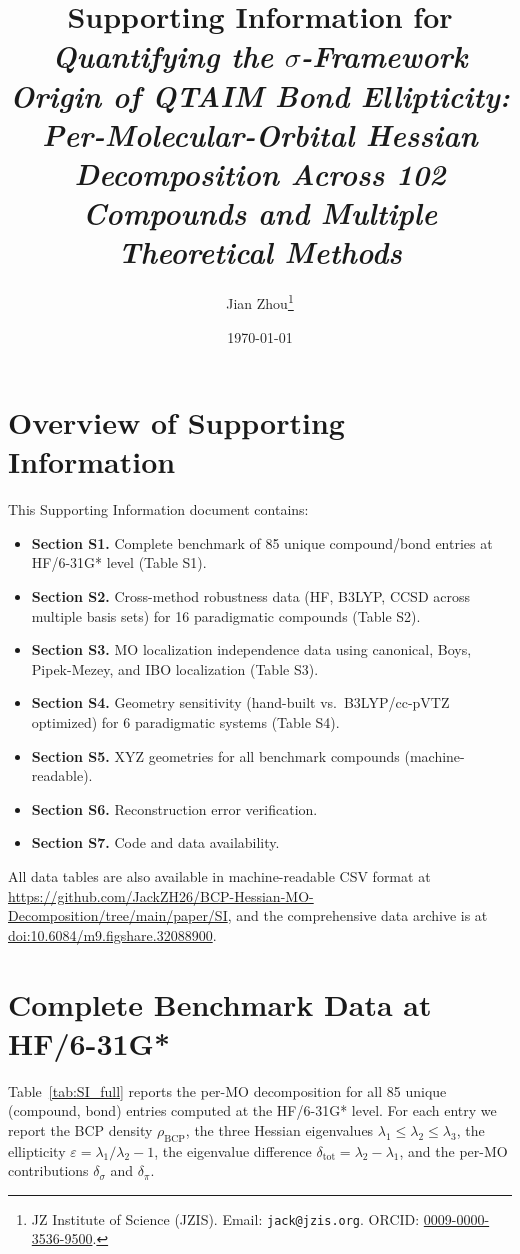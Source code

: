\documentclass[11pt,a4paper]{article}
\title{Supporting Information for\\[0.3em]
\textsl{Quantifying the $\sigma$-Framework Origin of QTAIM Bond Ellipticity:
Per-Molecular-Orbital Hessian Decomposition Across 102 Compounds and
Multiple Theoretical Methods}}
\author{Jian Zhou\thanks{JZ Institute of Science (JZIS).
Email: \texttt{jack@jzis.org}.
ORCID: \href{https://orcid.org/0009-0000-3536-9500}{0009-0000-3536-9500}.}}
\date{\today}
\begin{document}
\maketitle

\tableofcontents
\vspace{1cm}

\section*{Overview of Supporting Information}

This Supporting Information document contains:
\begin{itemize}
\item \textbf{Section S1.} Complete benchmark of 85 unique compound/bond entries
       at HF/6-31G* level (Table S1).
\item \textbf{Section S2.} Cross-method robustness data
       (HF, B3LYP, CCSD across multiple basis sets) for 16 paradigmatic
       compounds (Table S2).
\item \textbf{Section S3.} MO localization independence data using
       canonical, Boys, Pipek-Mezey, and IBO localization (Table S3).
\item \textbf{Section S4.} Geometry sensitivity (hand-built vs.\
       B3LYP/cc-pVTZ optimized) for 6 paradigmatic systems (Table S4).
\item \textbf{Section S5.} XYZ geometries for all benchmark compounds (machine-readable).
\item \textbf{Section S6.} Reconstruction error verification.
\item \textbf{Section S7.} Code and data availability.
\end{itemize}

\noindent
All data tables are also available in machine-readable CSV format at
\url{https://github.com/JackZH26/BCP-Hessian-MO-Decomposition/tree/main/paper/SI},
and the comprehensive data archive is at
\href{https://doi.org/10.6084/m9.figshare.32088900}{doi:10.6084/m9.figshare.32088900}.

\section{Complete Benchmark Data at HF/6-31G*}
\label{sec:SI_full}

Table~\ref{tab:SI_full} reports the per-MO decomposition for all 85
unique (compound, bond) entries computed at the HF/6-31G* level. For each
entry we report the BCP density $\rho_{\text{BCP}}$, the three Hessian
eigenvalues $\lambda_1 \le \lambda_2 \le \lambda_3$, the ellipticity
$\varepsilon = \lambda_1/\lambda_2 - 1$, the eigenvalue difference
$\delta_{\text{tot}} = \lambda_2 - \lambda_1$, and the per-MO
contributions $\delta_\sigma$ and $\delta_\pi$.
\end{document}
